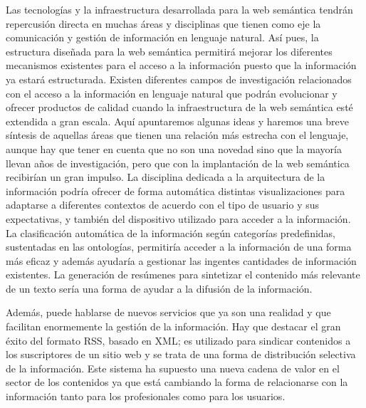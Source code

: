 Las tecnologías y la infraestructura desarrollada para la web semántica tendrán repercusión directa en muchas áreas y disciplinas que tienen como eje la comunicación y gestión de información en lenguaje natural.
Así pues, la estructura diseñada para la web semántica permitirá mejorar los diferentes mecanismos existentes para el acceso a la información puesto que la información ya estará estructurada. Existen diferentes campos de investigación relacionados con el acceso a la información en lenguaje natural que podrán evolucionar y ofrecer productos de calidad cuando la infraestructura de la web semántica esté extendida a gran escala. Aquí apuntaremos algunas ideas y haremos una breve síntesis de aquellas áreas que tienen una relación más estrecha con el lenguaje, aunque hay que tener en cuenta que no son una novedad sino que la mayoría llevan años de investigación, pero que con la implantación de la web semántica recibirían un gran impulso.
La disciplina dedicada a la arquitectura de la información podría ofrecer de forma automática distintas visualizaciones para adaptarse a diferentes contextos de acuerdo con el tipo de usuario y sus expectativas, y también del dispositivo utilizado para acceder a la información. La clasificación automática de la información según categorías predefinidas, sustentadas en las ontologías, permitiría acceder a la información de una forma más eficaz y además ayudaría a gestionar las ingentes cantidades de información existentes. La generación de resúmenes para sintetizar el contenido más relevante de un texto sería una forma de ayudar a la difusión de la información.

Además, puede hablarse de nuevos servicios que ya son una realidad y que facilitan enormemente la gestión de la información. Hay que destacar el gran éxito del formato RSS, basado en XML; es utilizado para sindicar contenidos a los suscriptores de un sitio web y se trata de una forma de distribución selectiva de la información. Este sistema ha supuesto una nueva cadena de valor en el sector de los contenidos ya que está cambiando la forma de relacionarse con la información tanto para los profesionales como para los usuarios.


